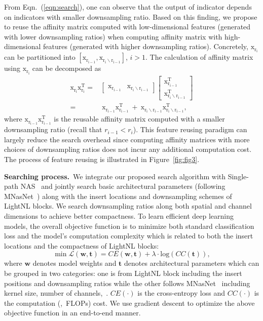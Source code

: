 \documentclass[10pt,twocolumn,letterpaper]{article}
\newcommand{\ma}[1]{\mathrm{#1}} \newcommand{\songbai}[1]{ \textcolor{red}{(song bai: #1)}  }
\begin{document}
From Eqn.~(\ref{eqn:search}), one can observe that the 
output of indicator depends on indicators with smaller downsampling ratio. Based on this finding, we propose to reuse the affinity matrix computed with low-dimensional features (generated with lower downsampling ratios) when computing affinity matrix with high-dimensional features (generated with higher downsampling ratios).
Concretely, $\ma{x_{r_i}}$ can be partitioned into $[\ma{x_{r_{i-1}}}, \ma{x_{r_i\backslash r_{i-1}}}]$, $i > 1$. The calculation of affinity matrix using $\ma{x_{r_i}}$ can be decomposed as
\begin{equation}
\begin{split}
    \ma{x_{r_i}}\ma{x_{r_i}^T} = &
    \begin{bmatrix}
    \ma{x_{r_{i-1}}} & \ma{x_{r_i\backslash r_{i-1}}}
    \end{bmatrix}
\begin{bmatrix}
    \ma{x_{r_{i-1}}^T} \\ \ma{x_{r_i\backslash r_{i-1}}^T}
    \end{bmatrix} \\
    = & \ \ma{x_{r_{i-1}}}\ma{x_{r_{i-1}}^T} \ + \  \ma{x_{r_i\backslash r_{i-1}}}\ma{x_{r_i\backslash r_{i-1}}^T},
\end{split}
\end{equation}
where $\ma{x_{r_{i-1}}}\ma{x_{r_{i-1}}^T}$ is the reusable affinity matrix computed with a smaller downsampling ratio (recall that $r_{i-1}<r_{i}$). This feature reusing paradigm can largely reduce the search overhead since computing affinity matrices with more choices of downsampling ratios does not incur any additional computation cost. The process of feature reusing is illustrated in Figure~\ref{fig:fig3}.

\vspace{0.5ex}\noindent\textbf{Searching process.}~We integrate our proposed search algorithm with Single-path NAS~\cite{stamoulis2019single} and jointly search basic architectural parameters (following MNasNet~\cite{tan2019mnasnet}) along with the insert locations and downsampling schemes of LightNL blocks.
We search downsampling ratios along both spatial and channel dimensions to achieve better compactness.
To learn efficient deep learning models, the overall objective function is to minimize both standard classification loss and the model's computation complexity which is related to both the insert locations and the compactness of LightNL blocks:
\begin{equation}\label{eq:loss}
   \min \mathcal{L}(\textbf{w}, \textbf{t}) = 
    CE( \textbf{w}, \textbf{t} ) + \lambda \cdot 
    \text{log}(CC(\textbf{t})),
\end{equation}
where $\textbf{w}$ denotes model weights and $\textbf{t}$ denotes architectural parameters which can be grouped in two categories: one is from LightNL block including the insert positions and downsampling ratios while the other follows MNasNet~\cite{tan2019mnasnet} including kernel size, number of channels,~\etc. $CE(\cdot)$ is the cross-entropy loss and $CC(\cdot)$ is the computation (\ie,~FLOPs) cost. We use gradient descent to optimize the above objective function in an end-to-end manner.
\end{document}
